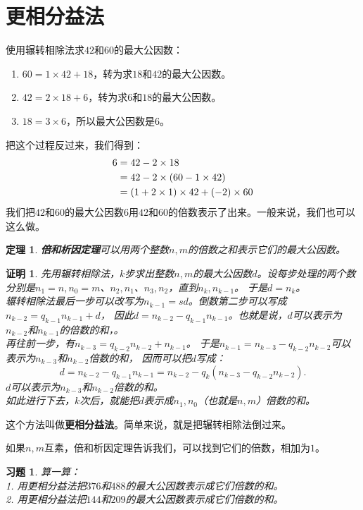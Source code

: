 \documentclass[12pt,UTF8]{ctexbook}
\newtheorem{tm}{定理}[section]
\newtheorem*{proof2}{证明}
\newtheorem{xt}{习题}[section]
\begin{document}
\section{更相分益法}
使用辗转相除法求$42$和$60$的最大公因数：
\begin{enumerate}
    \item $60 = 1 \times 42 + 18$，转为求$18$和$42$的最大公因数。
    \item $42 = 2 \times 18 + 6$，转为求$6$和$18$的最大公因数。
    \item $18 = 3 \times 6$，所以最大公因数是$6$。
\end{enumerate}
把这个过程反过来，我们得到：
\begin{align}
    6 &= 42 - 2 \times 18 \notag \\
    &= 42 - 2 \times (60 - 1 \times 42) \notag \\
    &= (1 + 2\times 1) \times 42 + (-2) \times 60 \notag 
\end{align}
我们把$42$和$60$的最大公因数$6$用$42$和$60$的倍数表示了出来。一般来说，我们也可以这么做。
\begin{tm}{\textbf{倍和析因定理}}\label{tm:5-2-0}
    可以用两个整数$n,m$的倍数之和表示它们的最大公因数。
\end{tm}
\begin{proof2}
    先用辗转相除法，$k$步求出整数$n,m$的最大公因数$d$。设每步处理的两个数分别是$n_1=n,n_0=m$、$n_2, n_1$、$n_3, n_2$，直到$n_k, n_{k-1}$。
    于是$d = n_k$。\\
    辗转相除法最后一步可以改写为$n_{k-1} = sd $。倒数第二步可以写成$n_{k-2} = q_{k-1}n_{k-1} + d$，
    因此$d = n_{k-2} -q_{k-1}n_{k-1}$。也就是说，$d$可以表示为$n_{k-2}$和$n_{k-1}$的倍数的和，。\\
    再往前一步，有$n_{k-3} = q_{k-2}n_{k-2} + n_{k-1}$。
    于是$n_{k-1} = n_{k-3} - q_{k-2}n_{k-2}$可以表示为$n_{k-3}$和$n_{k-2}$倍数的和，
    因而可以把$d$写成：
    $$d = n_{k-2} - q_{k-1}n_{k-1} = n_{k-2} - q_k(n_{k-3} - q_{k-2}n_{k-2}).$$
    $d$可以表示为$n_{k-3}$和$n_{k-2}$倍数的和。\\
    如此进行下去，$k$次后，就能把$d$表示成$n_1,n_0$（也就是$n,m$）倍数的和。
\end{proof2}
这个方法叫做\textbf{更相分益法}。简单来说，就是把辗转相除法倒过来。

如果$n,m$互素，倍和析因定理告诉我们，可以找到它们的倍数，相加为$1$。

\begin{xt}\label{xt:5-2-1}
    算一算：\\
    1. 用更相分益法把$376$和$488$的最大公因数表示成它们倍数的和。\\
    2. 用更相分益法把$144$和$209$的最大公因数表示成它们倍数的和。
\end{xt}
\end{document}
